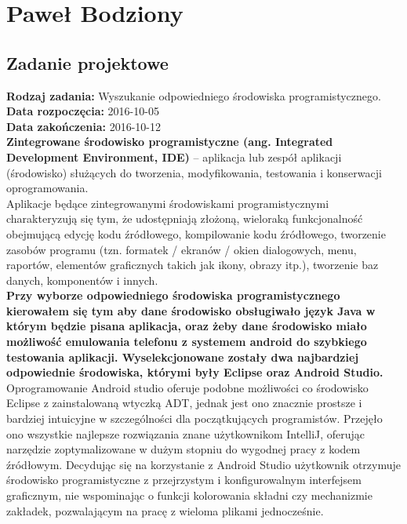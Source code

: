 \chapter {Paweł Bodziony}
\section{Zadanie projektowe}
\noindent\textbf{Rodzaj zadania:} Wyszukanie odpowiedniego środowiska programistycznego. \\

\noindent\textbf{Data rozpoczęcia:} 2016-10-05\\

\noindent\textbf{Data zakończenia:} 2016-10-12\\


\textbf{Zintegrowane środowisko programistyczne (ang. Integrated Development Environment, IDE)} – aplikacja lub zespół aplikacji (środowisko) służących do tworzenia, modyfikowania, testowania i konserwacji oprogramowania.
\\

Aplikacje będące zintegrowanymi środowiskami programistycznymi charakteryzują się tym, że udostępniają złożoną, wieloraką funkcjonalność obejmującą edycję kodu źródłowego, kompilowanie kodu źródłowego, tworzenie zasobów programu (tzn. formatek / ekranów / okien dialogowych, menu, raportów, elementów graficznych takich jak ikony, obrazy itp.), tworzenie baz danych, komponentów i innych.
\\

\textbf{Przy wyborze odpowiedniego środowiska programistycznego kierowałem się tym aby dane środowisko obsługiwało język Java w którym będzie pisana aplikacja, oraz żeby dane środowisko miało możliwość emulowania telefonu z systemem android do szybkiego testowania aplikacji. Wyselekcjonowane zostały dwa  najbardziej odpowiednie środowiska, którymi były Eclipse oraz Android Studio.}
\\

Oprogramowanie Android studio oferuje podobne możliwości co środowisko Eclipse z zainstalowaną wtyczką ADT, jednak jest ono znacznie prostsze i bardziej intuicyjne w szczególności dla początkujących programistów. Przejęło ono wszystkie najlepsze rozwiązania znane użytkownikom IntelliJ, oferując narzędzie zoptymalizowane w dużym stopniu do wygodnej pracy z kodem źródłowym. Decydując się na korzystanie z Android Studio użytkownik otrzymuje środowisko programistyczne z przejrzystym i konfigurowalnym interfejsem graficznym, nie wspominając o funkcji kolorowania składni czy mechanizmie zakładek, pozwalającym na pracę z wieloma plikami jednocześnie.

